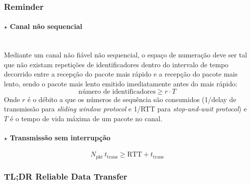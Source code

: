 \subsubsection[3.4.5 Reminder]{\hspace*{0.075 em}\raisebox{0.2 em}{$\pmb{\rightarrow}$} Reminder}
\label{subsec:reminder}

\paragraph[3.4.5.1 Canal não sequencial]{$\pmb{\star}$ Canal não sequencial}\mbox{}\\[4pt]
\noindent Mediante um canal não fiável não sequencial, o espaço de numeração deve ser tal que não existam repetições de identificadores dentro do intervalo de tempo decorrido entre a recepção do pacote mais rápido e a recepção do pacote mais lento, sendo o pacote mais lento emitido imediatamente antes do mais rápido:
$$
    \boxed{\text{número de identificadores} \ge r \cdot T}
$$
\noindent Onde $r$ é o débito a que os números de sequência são consumidos (1/delay de transmissão para \textit{sliding window protocol} e 1/RTT para \textit{stop-and-wait protocol}) e $T$ é o tempo de vida máxima de um pacote no canal.

\paragraph[3.4.5.2 Transmissão sem interrupção]{$\pmb{\star}$ Transmissão sem interrupção}\mbox{}
$$
    \boxed{ N_\text{pkt}\, t_\text{trans} \ge \text{RTT} + t_\text{trans} }
$$
\newpage
\subsubsection[3.4.5 TL;DR Reliable Data Transfer]{\hspace*{0.075 em}\raisebox{0.2 em}{$\pmb{\rightarrow}$} TL;DR Reliable Data Transfer}
\label{subsec:TLDR}

